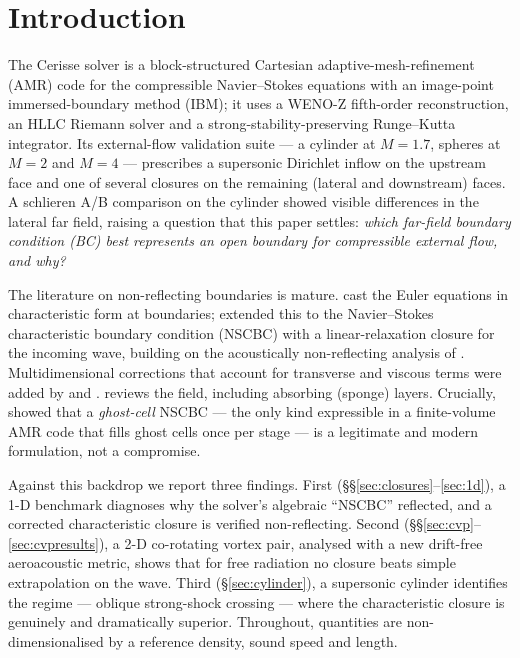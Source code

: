 \documentclass{jfm}
\begin{document}
\section{Introduction}\label{sec:intro}
The Cerisse solver is a block-structured Cartesian adaptive-mesh-refinement
(AMR) code for the compressible Navier--Stokes equations with an image-point
immersed-boundary method (IBM); it uses a WENO-Z fifth-order reconstruction, an
HLLC Riemann solver and a strong-stability-preserving Runge--Kutta integrator.
Its external-flow validation suite --- a cylinder at $M=1.7$, spheres at $M=2$
and $M=4$ --- prescribes a supersonic Dirichlet inflow on the upstream face and
one of several closures on the remaining (lateral and downstream) faces. A
schlieren A/B comparison on the cylinder showed visible differences in the
lateral far field, raising a question that this paper settles: \emph{which
far-field boundary condition (BC) best represents an open boundary for
compressible external flow, and why?}

The literature on non-reflecting boundaries is mature. \citet{thompson1987} cast
the Euler equations in characteristic form at boundaries; \citet{poinsot1992}
extended this to the Navier--Stokes characteristic boundary condition (NSCBC)
with a linear-relaxation closure for the incoming wave, building on the
acoustically non-reflecting analysis of \citet{rudy1980}. Multidimensional
corrections that account for transverse and viscous terms were added by
\citet{yoo2007} and \citet{lodato2008}. \citet{colonius2004} reviews the field,
including absorbing (sponge) layers. Crucially, \citet{motheau2017} showed that
a \emph{ghost-cell} NSCBC --- the only kind expressible in a finite-volume AMR
code that fills ghost cells once per stage --- is a legitimate and modern
formulation, not a compromise.

Against this backdrop we report three findings. First
(\S\S\ref{sec:closures}--\ref{sec:1d}), a 1-D benchmark diagnoses why the
solver's algebraic ``NSCBC'' reflected, and a corrected characteristic closure
is verified non-reflecting. Second (\S\S\ref{sec:cvp}--\ref{sec:cvpresults}), a
2-D co-rotating vortex pair, analysed with a new drift-free aeroacoustic metric,
shows that for free radiation no closure beats simple extrapolation on the wave.
Third (\S\ref{sec:cylinder}), a supersonic cylinder identifies the regime ---
oblique strong-shock crossing --- where the characteristic closure is genuinely
and dramatically superior. Throughout, quantities are non-dimensionalised by a
reference density, sound speed and length.
\end{document}
